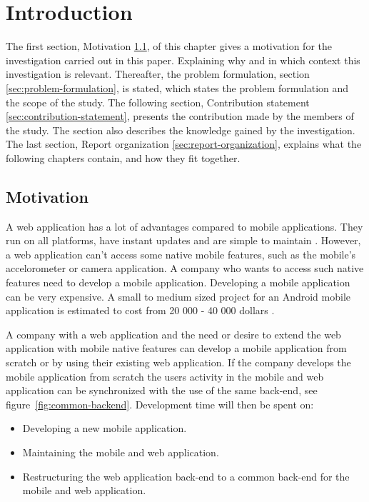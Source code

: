 \chapter{Introduction}\label{ch:introduction}
The first section, Motivation \ref{sec:motivation}, of this chapter gives a motivation for the investigation carried out in this paper. Explaining why and in which context this investigation is relevant. Thereafter, the problem formulation, section \ref{sec:problem-formulation}, is stated, which states the problem formulation and the scope of the study. The following section, Contribution statement \ref{sec:contribution-statement}, presents the contribution made by the members of the study. The section also describes the knowledge gained by the investigation. The last section, Report organization \ref{sec:report-organization}, explains what the following chapters contain, and how they fit together.

\section{Motivation}\label{sec:motivation}
A web application has a lot of advantages compared to mobile applications. They run on all platforms, have instant updates and are simple to maintain \cite{michaels2013}. However, a web application can't access some native mobile features, such as the mobile's accelorometer or camera application. A company who wants to access such native features need to develop a mobile application. Developing a mobile application can be very expensive. A small to medium sized project for an Android mobile application is estimated to cost from 20 000 - 40 000 dollars \cite{kohan2015}.

A company with a web application and the need or desire to extend the web application with mobile native features can develop a mobile application from scratch or by using their existing web application. If the company develops the mobile application from scratch the users activity in the mobile and web application can be synchronized with the use of the same back-end, see figure~\ref{fig:common-backend}. Development time will then be spent on:
\begin{itemize}
\item Developing a new mobile application.
\item Maintaining the mobile and web application.
\item Restructuring the web application back-end to a common back-end for the mobile and web application.
\end{itemize}

